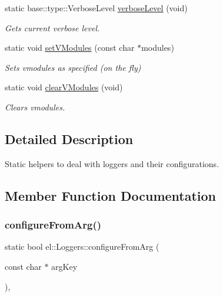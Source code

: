 \begin{DoxyCompactItemize}
\mbox{\label{classel_1_1_loggers_ad4840bb4b6b80746a2212cf3cc058142}} 
static base\+::type\+::\+Verbose\+Level \hyperlink{classel_1_1_loggers_ad4840bb4b6b80746a2212cf3cc058142}{verbose\+Level} (void)
\begin{DoxyCompactList}\small\item\em Gets current verbose level. \end{DoxyCompactList}\item 
\mbox{\label{classel_1_1_loggers_acbc5e2cef230331c57f364852a671507}} 
static void \hyperlink{classel_1_1_loggers_acbc5e2cef230331c57f364852a671507}{set\+V\+Modules} (const char $\ast$modules)
\begin{DoxyCompactList}\small\item\em Sets vmodules as specified (on the fly) \end{DoxyCompactList}\item 
\mbox{\label{classel_1_1_loggers_afcf50abc11530eb7f28fcab7eab27e4f}} 
static void \hyperlink{classel_1_1_loggers_afcf50abc11530eb7f28fcab7eab27e4f}{clear\+V\+Modules} (void)
\begin{DoxyCompactList}\small\item\em Clears vmodules. \end{DoxyCompactList}\end{DoxyCompactItemize}


\subsection{Detailed Description}
Static helpers to deal with loggers and their configurations. 

\subsection{Member Function Documentation}
\mbox{\label{classel_1_1_loggers_a28acf6f2b1ea7e5edd1b2560cde82406}} 
\subsubsection{\texorpdfstring{configure\+From\+Arg()}{configureFromArg()}}
{\footnotesize\ttfamily static bool el\+::\+Loggers\+::configure\+From\+Arg (\begin{DoxyParamCaption}\item[{const char $\ast$}]{arg\+Key }\end{DoxyParamCaption})\hspace{0.3cm}{\ttfamily [inline]}, {\ttfamily [static]}}



